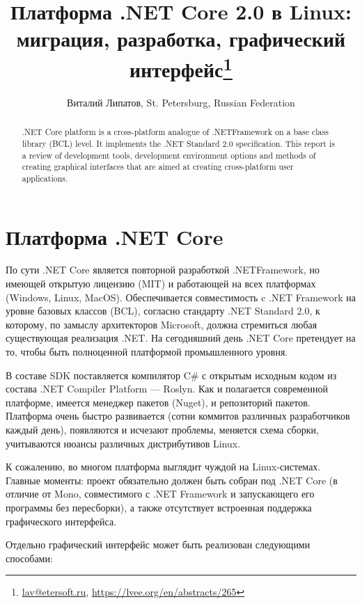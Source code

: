 \documentclass[10pt, a5paper]{article}
\begin{document}
\title{Платформа .NET Core 2.0 в Linux: миграция, разработка, графический интерфейс\footnote{\url{lav@etersoft.ru}, \url{https://lvee.org/en/abstracts/265}}}
\author{Виталий Липатов, St. Petersburg, Russian Federation}
\maketitle
\begin{abstract}
.NET Core platform is a cross-platform analogue of .NET\linebreak Framework on a base class library (BCL) level. It implements the .NET Standard 2.0 specification. This report is a review of development tools, development environment options and methods of creating graphical interfaces that are aimed at creating cross-platform user applications.
\end{abstract}
\section*{Платформа .NET Core}

По сути .NET Core является повторной разработкой .NET\linebreak Framework, но имеющей открытую лицензию (MIT) и работающей на всех платформах (Windows, Linux, MacOS). Обеспечивается совместимость c .NET Framework на уровне базовых классов  (BCL), согласно стандарту .NET Standard 2.0, к которому, по замыслу архитекторов Microsoft, должна стремиться любая существующая реализация .NET. На сегодняшний день .NET Core претендует на то, чтобы быть полноценной платформой промышленного уровня.

В составе SDK поставляется компилятор C\# с открытым исходным кодом из состава .NET Compiler Platform — Roslyn. Как и полагается современной платформе, имеется менеджер пакетов (Nuget), и репозиторий пакетов. Платформа очень быстро развивается (сотни коммитов различных разработчиков каждый день), появляются и исчезают проблемы, меняется схема сборки, учитываются нюансы различных дистрибутивов Linux.

К сожалению, во многом платформа выглядит чуждой на Linux-системах. Главные моменты: проект обязательно должен быть собран под .NET Core (в отличие от Mono, совместимого с .NET Framework и запускающего его программы без пересборки), а также отсутствует встроенная поддержка графического интерфейса.

Отдельно графический интерфейс может быть реализован следующими способами:
\end{document}

